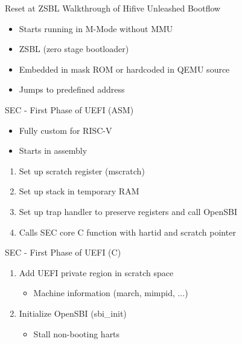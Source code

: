 \documentclass[
  10pt
]{beamer}
\begin{document}
\begin{frame}{Reset at ZSBL}
  Walkthrough of Hifive Unleashed Bootflow

  \vfill

  \begin{itemize}
    \item Starts running in M-Mode without MMU
    \item ZSBL (zero stage bootloader)
  \end{itemize}

  \begin{itemize}
    \item Embedded in mask ROM or hardcoded in QEMU source
    \item Jumps to predefined address %
  \end{itemize}
\end{frame}

\begin{frame}{SEC - First Phase of UEFI (ASM)}
  \begin{itemize}
    \item Fully custom for RISC-V
    \item Starts in assembly %
  \end{itemize}

  \begin{enumerate}
    \item Set up scratch register (mscratch) %
    \item Set up stack in temporary RAM
    \item Set up trap handler to preserve registers and call OpenSBI
    \item Calls SEC core C function with hartid and scratch pointer
  \end{enumerate}

\end{frame}

\begin{frame}{SEC - First Phase of UEFI (C)}
  \begin{enumerate}
    \item Add UEFI private region in scratch space
    \begin{itemize}
      \item Machine information (march, mimpid, ...)
    \end{itemize}
    \item Initialize OpenSBI (sbi\_init)
    \begin{itemize}
      \item Stall non-booting harts
    \end{itemize}
  \end{enumerate}
\end{frame}
\end{document}
